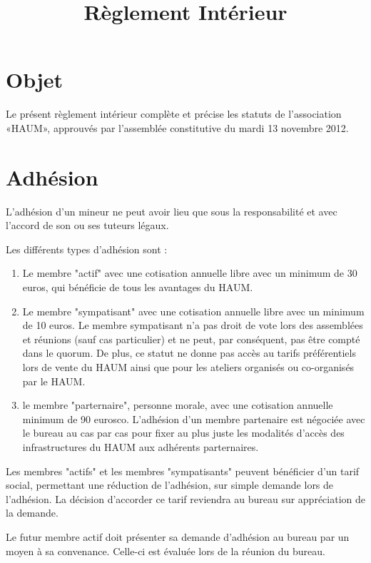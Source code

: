 \documentclass[a4paper, 11pt]{article}
\title{Règlement Intérieur}
\author{}
\date{}
\newcommand{\nomHS}{HAUM}
\newcommand{\dateAGC}{mardi 13 novembre 2012}
\newcommand{\prixNormal}{30 euros}
\newcommand{\prixSympatisant}{10 euros}
\newcommand{\prixPartenaire}{90 eurosco}
\begin{document}
    \maketitle

\section{Objet} %

Le présent règlement intérieur complète et précise les statuts de l'association «\nomHS», approuvés par l'assemblée
constitutive du \dateAGC{}.


\section{Adhésion} %

L'adhésion d'un mineur ne peut avoir lieu que sous la responsabilité et avec l'accord de son ou ses tuteurs légaux.

Les différents types d'adhésion sont :

\begin{enumerate}
	\item Le membre "actif" avec une cotisation annuelle libre avec un minimum de \prixNormal{}, qui bénéficie de tous les avantages du \nomHS{}.
	\item Le membre "sympatisant" avec une cotisation annuelle libre avec un minimum de \prixSympatisant{}. Le membre sympatisant n'a pas droit de vote lors des assemblées et réunions (sauf cas particulier) et ne peut, par conséquent, pas être compté dans le quorum. De plus, ce statut ne donne pas accès au tarifs préférentiels lors de vente du \nomHS{} ainsi que pour les ateliers organisés ou co-organisés par le \nomHS{}.
	\item le membre "parternaire", personne morale, avec une cotisation annuelle minimum de \prixPartenaire{}. L'adhésion d'un membre partenaire est négociée avec le bureau au cas par cas pour fixer au plus juste les modalités d'accès des infrastructures du \nomHS{} aux adhérents parternaires.
\end{enumerate}

Les membres "actifs" et les membres "sympatisants" peuvent bénéficier d'un tarif social, permettant une réduction de l'adhésion, sur simple demande lors de l'adhésion. La décision d'accorder ce tarif reviendra au bureau sur appréciation de la demande.

Le futur membre actif doit présenter sa demande d'adhésion au bureau par un moyen à sa convenance.
Celle-ci est évaluée lors de la réunion du bureau.
\end{document}
